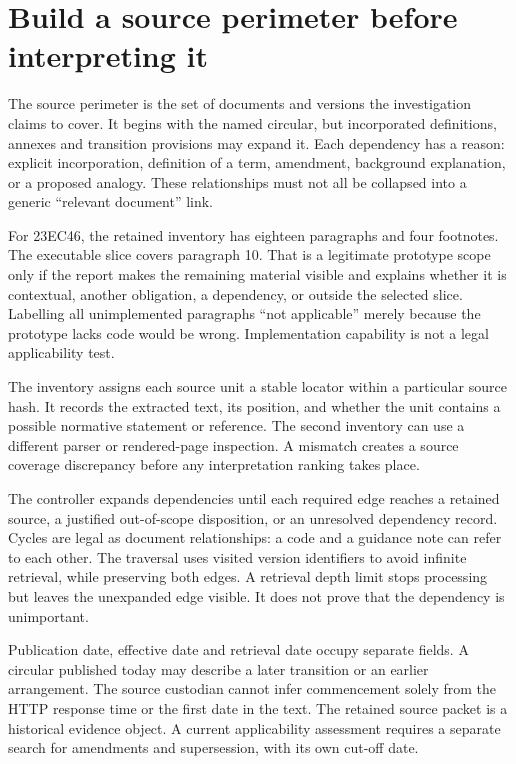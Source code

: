 \section{Build a source perimeter before interpreting it}

The source perimeter is the set of documents and versions the investigation
claims to cover. It begins with the named circular, but incorporated definitions,
annexes and transition provisions may expand it. Each dependency has a reason:
explicit incorporation, definition of a term, amendment, background explanation,
or a proposed analogy. These relationships must not all be collapsed into a
generic ``relevant document'' link.

For 23EC46, the retained inventory has eighteen paragraphs and four footnotes.
The executable slice covers paragraph 10. That is a legitimate prototype scope
only if the report makes the remaining material visible and explains whether it
is contextual, another obligation, a dependency, or outside the selected slice.
Labelling all unimplemented paragraphs ``not applicable'' merely because the
prototype lacks code would be wrong. Implementation capability is not a legal
applicability test.

The inventory assigns each source unit a stable locator within a particular
source hash. It records the extracted text, its position, and whether the unit
contains a possible normative statement or reference. The second inventory can
use a different parser or rendered-page inspection. A mismatch creates a source
coverage discrepancy before any interpretation ranking takes place.

The controller expands dependencies until each required edge reaches a retained
source, a justified out-of-scope disposition, or an unresolved dependency record.
Cycles are legal as document relationships: a code and a guidance note can refer
to each other. The traversal uses visited version identifiers to avoid infinite
retrieval, while preserving both edges. A retrieval depth limit stops processing
but leaves the unexpanded edge visible. It does not prove that the dependency is
unimportant.

Publication date, effective date and retrieval date occupy separate fields. A
circular published today may describe a later transition or an earlier
arrangement. The source custodian cannot infer commencement solely from the HTTP
response time or the first date in the text. The retained source packet is a
historical evidence object. A current applicability assessment requires a
separate search for amendments and supersession, with its own cut-off date.


